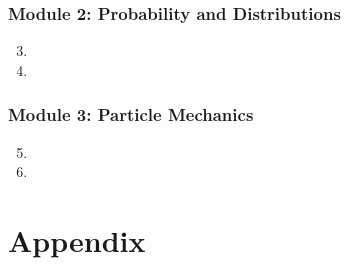 \documentclass[fleqn,titlepage]{book}
\numberwithin{equation}{section}
\theoremstyle{plain}
\theoremstyle{definition}
\theoremstyle{remark}
\begin{document}
\section{Module 2: Probability and Distributions}
\begin{enumerate}[label=\bfseries  \arabic*.]\setcounter{enumi}{2}
\item 
\item 
\end{enumerate}
\section{Module 3: Particle Mechanics}
\begin{enumerate}[label=\bfseries  \arabic*.]\setcounter{enumi}{4}
\item 
\item 
\end{enumerate}

\part{Appendix}
\end{document}

